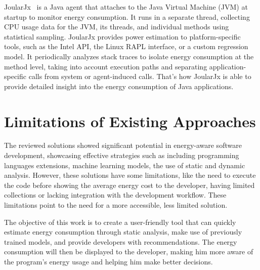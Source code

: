 JoularJx~\cite{noureddine-ie-2022} is a Java agent that attaches to the Java Virtual Machine (JVM) at startup to monitor energy consumption. It runs in a separate thread, collecting CPU usage data for the JVM, its threads, and individual methods using statistical sampling. JoularJx provides power estimation to platform-specific tools, such as the Intel API, the Linux RAPL interface, or a custom regression model. It periodically analyzes stack traces to isolate energy consumption at the method level, taking into account execution paths and separating application-specific calls from system or agent-induced calls. That's how JoularJx is able to provide detailed insight into the energy consumption of Java applications.

\section{Limitations of Existing Approaches}

The reviewed solutions showed significant potential in energy-aware software development, showcasing effective strategies such as including programming languages extensions, machine learning models, the use of static and dynamic analysis. However, these solutions have some limitations, like the need to execute the code before showing the average energy cost to the developer, having limited collections or lacking integration with the development workflow. These limitations point to the need for a more accessible, less limited solution.

The objective of this work is to create a user-friendly tool that can quickly estimate energy consumption through static analysis, make use of previously trained models, and provide developers with recommendations. The energy consumption will then be displayed to the developer, making him more aware of the program's energy usage and helping him make better decisions.